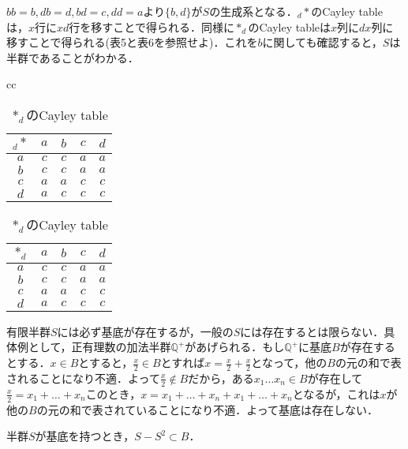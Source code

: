 $bb=b,db=d,bd=c,dd=a$より$\{b,d\}$が$S$の生成系となる．$_{d}*$のCayley tableは，$x$行に$xd$行を移すことで得られる．同様に$*_{d}$のCayley tableは$x$列に$dx$列に移すことで得られる(表5と表6を参照せよ)．これを$b$に関しても確認すると，$S$は半群であることがわかる．
\begin{table}[htbp]
\begin{center}
\begin{tabular}{cc}
\begin{minipage}{0.5\hsize}
\begin{center}
\begin{tabular}{c|cccc}
$_{d}*$&$a$&$b$&$c$&$d$ \\ \hline
$a$&$c$&$c$&$a$&$a$ \\
$b$&$c$&$c$&$a$&$a$ \\
$c$&$a$&$a$&$c$&$c$ \\
$d$&$a$&$c$&$c$&$c$  
\end{tabular}
\caption{$_{d}*$のCayley table}
\end{center}
\end{minipage}
\begin{minipage}{0.5\hsize}
\begin{center}
\begin{tabular}{c|cccc}
$*_d$&$a$&$b$&$c$&$d$ \\ \hline
$a$&$c$&$c$&$a$&$a$ \\
$b$&$c$&$c$&$a$&$a$ \\
$c$&$a$&$a$&$c$&$c$ \\
$d$&$a$&$c$&$c$&$c$ 
\end{tabular}
\caption{$*_d$のCayley table}
\end{center}
\end{minipage}
\end{tabular}
\end{center}
\end{table}
有限半群$S$には必ず基底が存在するが，一般の$S$には存在するとは限らない．具体例として，正有理数の加法半群$\mathbb Q^{+}$があげられる．もし$\mathbb Q^{+}$に基底$B$が存在するとする．$x\in B$とすると，$\frac{x}{2}\in B$とすれば$x=\frac{x}{2}+\frac{x}{2}$となって，他の$B$の元の和で表されることになり不適．よって$\frac{x}{2}\notin B$だから，ある$x_1\dots x_n\in B$が存在して$\frac{x}{2}=x_1+\dots+x_n$このとき，$x=x_1+\dots+x_n+x_1+\dots+x_n$となるが，これは$x$が他の$B$の元の和で表されていることになり不適．よって基底は存在しない．
\begin{slem}
半群$S$が基底を持つとき，$S-S^2\subset B$．
\end{slem}

